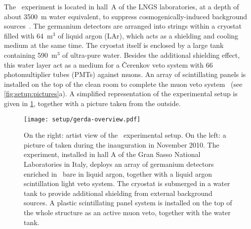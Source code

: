 The \gerda\ experiment is located in hall~A of the LNGS laboratories, at a depth of about
3500~m water equivalent, to suppress cosmogenically-induced background
sources~\cite{Wiesinger2018}. The germanium detectors are arranged into strings within a
cryostat filled with 64~m$^3$ of liquid argon (LAr), which acts as a shielding and cooling
medium at the same time. The cryostat itself is enclosed by a large tank containing
590~m$^3$ of ultra-pure water.  Besides the additional shielding effect, this water layer
act as a medium for a \v{C}erenkov veto system with 66 photomultiplier tubes (PMTs)
against muons. An array of scintillating panels is installed on the top of the clean room
to complete the muon veto system~\cite{Freund2016} (see \cref{fig:setup:pictures}a). A
simplified representation of the experimental setup is given in \cref{fig:setup:overview},
together with a picture taken from the outside.

\begin{figure}
  \centering
  \texttt{[image: setup/gerda-overview.pdf]}
  \caption{%
    On the right: artist view of the \gerda\ experimental setup. On the left: a picture of
    taken during the inauguration in November 2010. The experiment, installed in hall A of
    the Gran Sasso National Laboratories in Italy, deploys an array of germanium detectors
    enriched in \gesix\ bare in liquid argon, together with a liquid argon scintillation
    light veto system. The cryostat is submerged in a water tank to provide additional
    shielding from external background sources. A plastic scintillating panel system is
    installed on the top of the whole structure as an active muon veto, together with the
    water tank.
  }\label{fig:setup:overview}
\end{figure}

